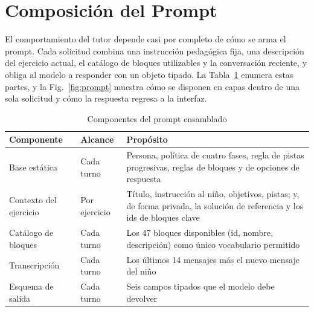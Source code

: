 \documentclass[conference]{IEEEtran}
\begin{document}
\section{Composición del Prompt}
\label{sec:prompt}

El comportamiento del tutor depende casi por completo de cómo se arma el prompt. Cada solicitud combina una instrucción pedagógica fija, una descripción del ejercicio actual, el catálogo de bloques utilizables y la conversación reciente, y obliga al modelo a responder con un objeto tipado. La Tabla~\ref{tab:prompt} enumera estas partes, y la Fig.~\ref{fig:prompt} muestra cómo se disponen en capas dentro de una sola solicitud y cómo la respuesta regresa a la interfaz.

\begin{table}[!t]
\caption{Componentes del prompt ensamblado}
\label{tab:prompt}
\centering
\renewcommand{\arraystretch}{1.25}
\begin{tabular}{@{}p{1.9cm}p{1.4cm}p{3.5cm}@{}}
\toprule
\textbf{Componente} & \textbf{Alcance} & \textbf{Propósito} \\
\midrule
Base estática & Cada turno & Persona, política de cuatro fases, regla de pistas progresivas, reglas de bloques y de opciones de respuesta \\
Contexto del ejercicio & Por ejercicio & Título, instrucción al niño, objetivos, pistas; y, de forma privada, la solución de referencia y los ids de bloques clave \\
Catálogo de bloques & Cada turno & Los 47 bloques disponibles (id, nombre, descripción) como único vocabulario permitido \\
Transcripción & Cada turno & Los últimos 14 mensajes más el nuevo mensaje del niño \\
Esquema de salida & Cada turno & Seis campos tipados que el modelo debe devolver \\
\bottomrule
\end{tabular}
\end{table}
\end{document}
